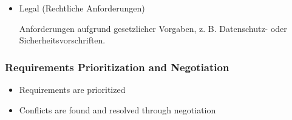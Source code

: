 \begin{defBox}[title=Classification \& Organization]
\begin{itemize}
\begin{itemize}
\begin{infoBox}
                Anforderungen an die Bereitstellung des Systems, z. B. Installationspakete oder Dokumentation.
            \end{infoBox}
            \item Legal (Rechtliche Anforderungen)
            \begin{infoBox}
                Anforderungen aufgrund gesetzlicher Vorgaben, z. B. Datenschutz- oder Sicherheitsvorschriften.
            \end{infoBox}
        \end{itemize}
    \end{itemize}
\end{defBox}

\subsubsection*{Requirements Prioritization and Negotiation}
\begin{defBox}[title=Prioritization \& Negotiation]
    \begin{itemize}
        \item Requirements are prioritized
        \item Conflicts are found and resolved through negotiation
    \end{itemize}
\end{defBox}

